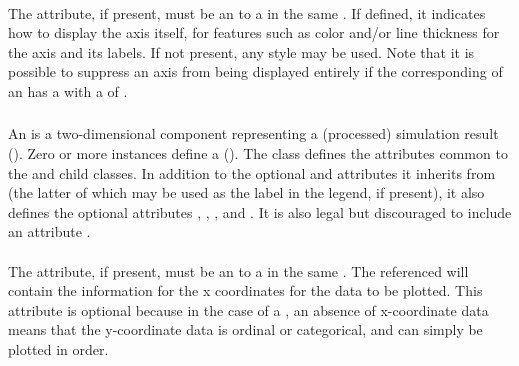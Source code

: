 \begin{blockChanged}
\paragraph*{}
The  attribute, if present, must be an \SIdRef to a \Style in the same \SedDocument.  If defined, it indicates how to display the axis itself, for features such as color and/or line thickness for the axis and its labels.  If not present, any style may be used.  Note that it is possible to suppress an axis from being displayed entirely if the corresponding \Style of an \Axis has a  with a  of .



\subsubsection{}
\label{class:abstractCurve}
An \AbstractCurve is a two-dimensional \Output component representing a (processed) simulation result (). Zero or more \AbstractCurve instances define a \PlotTwo ().  The \AbstractCurve class defines the attributes common to the \Curve and \ShadedArea child classes.  In addition to the optional  and  attributes it inherits from \SedBase (the latter of which may be used as the label in the \Plot legend, if present), it also defines the optional attributes , , , and .  It is also legal but discouraged to include an attribute .


\paragraph*{}
The  attribute, if present, must be an \SIdRef to a \DataGenerator in the same \SedDocument.  The referenced \DataGenerator will contain the information for the x coordinates for the data to be plotted.  This attribute is optional because in the case of a \Curve, an absence of x-coordinate data means that the y-coordinate data is ordinal or categorical, and can simply be plotted in order.


\end{blockChanged}
